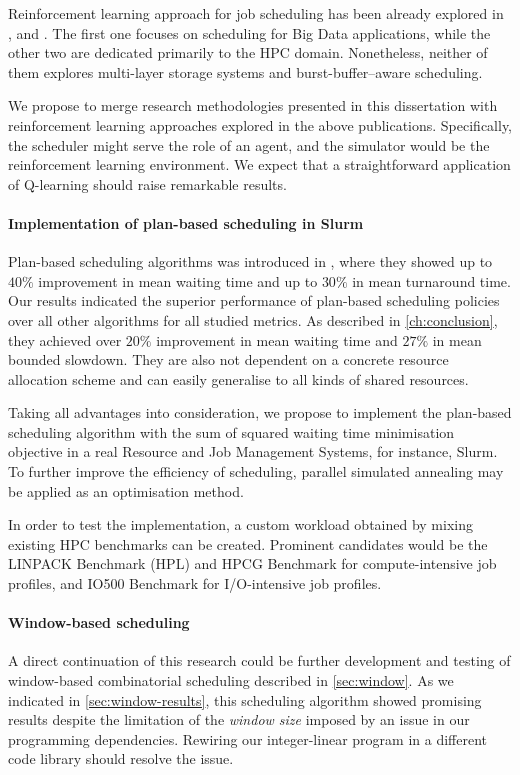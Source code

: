 \documentclass[thesis-en.tex]{subfiles}
\begin{document}
Reinforcement learning approach for job scheduling has been already explored in \cite{mao2019learning}, \cite{zhang2020rlscheduler} and \cite{baheri2020mars}. The first one focuses on scheduling for Big Data applications, while the other two are dedicated primarily to the HPC domain. Nonetheless, neither of them explores multi-layer storage systems and burst-buffer--aware scheduling.

We propose to merge research methodologies presented in this dissertation with reinforcement learning approaches explored in the above publications. Specifically, the scheduler might serve the role of an agent, and the simulator would be the reinforcement learning environment. We expect that a straightforward application of Q-learning should raise remarkable results.

\paragraph{Implementation of plan-based scheduling in Slurm}
Plan-based scheduling algorithms was introduced in \cite{zheng2016exploring}, where they showed up to $40\%$ improvement in mean waiting time and up to $30\%$ in mean turnaround time.
Our results indicated the superior performance of plan-based scheduling policies over all other algorithms for all studied metrics. As described in \autoref{ch:conclusion}, they achieved over $20\%$ improvement in mean waiting time and $27\%$ in mean bounded slowdown. They are also not dependent on a concrete resource allocation scheme and can easily generalise to all kinds of shared resources.

Taking all advantages into consideration, we propose to implement the plan-based scheduling algorithm with the sum of squared waiting time minimisation objective in a real Resource and Job Management Systems, for instance, Slurm. To further improve the efficiency of scheduling, parallel simulated annealing may be applied as an optimisation method.

In order to test the implementation, a custom workload obtained by mixing existing HPC benchmarks can be created. Prominent candidates would be the LINPACK Benchmark (HPL) and HPCG Benchmark for compute-intensive job profiles, and IO500 Benchmark for I/O-intensive job profiles.

\paragraph{Window-based scheduling}
A direct continuation of this research could be further development and testing of window-based combinatorial scheduling described in \autoref{sec:window}. As we indicated in \autoref{sec:window-results}, this scheduling algorithm showed promising results despite the limitation of the \emph{window size} imposed by an issue in our programming dependencies. Rewiring our integer-linear program in a different code library should resolve the issue.
\end{document}
